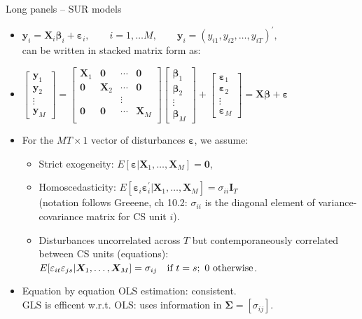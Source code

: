 \documentclass[usenames,dvipsnames]{beamer}
\begin{document}
\begin{frame}{Long panels -- SUR models}
\small
\begin{itemize}
    \item $\bm{y}_i = \bm{X}_i \bm{\beta}_i + \bm{\varepsilon}_i,\qquad i = 1,\dots M,\qquad \bm{y}_i = (y_{i1},y_{i2},\dots,y_{iT})^{\prime}, $\\ \smallskip 
    can be written in stacked matrix form as:
    \medskip
    \item $\begin{bmatrix}
    \bm{y}_1 \\ \bm{y}_2 \\ \vdots \\ \bm{y}_M
    \end{bmatrix} = 
    \begin{bmatrix} 
    \bm{X}_1 & \bm{0} & \cdots & \bm{0} \\ 
    \bm{0} & \bm{X}_2 & \cdots & \bm{0} \\ 
      &   & \vdots &  \\ 
    \bm{0} & \bm{0} & \cdots & \bm{X}_M \\ 
    \end{bmatrix}
    \begin{bmatrix}
    \bm{\beta}_1 \\ \bm{\beta}_2 \\ \vdots \\ \bm{\beta}_M
    \end{bmatrix} + 
    \begin{bmatrix}
    \bm{\varepsilon}_1 \\ \bm{\varepsilon}_2 \\ \vdots \\ \bm{\varepsilon}_M
    \end{bmatrix} = \bm{X\beta}+\bm{\varepsilon}$
    \medskip
    \item For the $MT \times 1$ vector of disturbances $\bm{\varepsilon}$, we assume:
    \begin{itemize}
        \item Strict exogeneity: $E[\bm{\varepsilon}|\bm{X}_1,\dots,\bm{X}_M]=\bm{0}$,
        \item Homoscedasticity: $E[\bm{\varepsilon}_i \bm{\varepsilon}_i^{\prime} |\bm{X}_1,\dots,\bm{X}_M]=\sigma_{ii}\bm{I}_T$\\ (notation follows Greeene, ch 10.2: $\sigma_{ii}$ is the diagonal element of variance-covariance matrix for CS unit $i$).
        \item Disturbances uncorrelated across $T$ but contemporaneously correlated between CS units (equations):\\
        $E[\varepsilon_{it} \varepsilon_{js} |\bm{X}_1,\dots,\bm{X}_M]=\sigma_{ij}~~~\textnormal{if}~t=s;~0~\textnormal{otherwise}$.
    \end{itemize}
    \item Equation by equation OLS estimation: consistent. \\
    GLS is efficent w.r.t. OLS: uses information in $\bm{\Sigma} = [\sigma_{ij}]$.
\end{itemize}
\end{frame}
\end{document}
